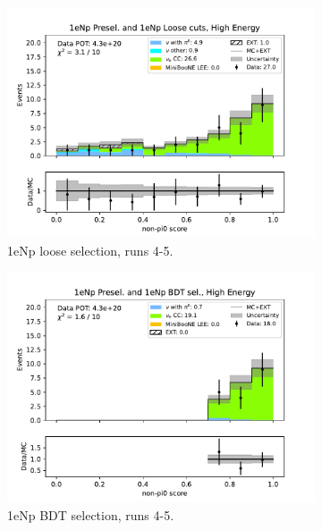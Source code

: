 \begin{figure}[H]
\begin{subfigure}{0.33\linewidth}
    \includegraphics[width=\linewidth]{technote/Sidebands/Figures/FarSideband/far_sideband_nonpi0_score_run4b4c4d5_NP_NPL_HIGH_ENERGY.pdf}
    \caption{1eNp loose selection, runs 4-5.}
    \end{subfigure}%
    \begin{subfigure}{0.33\linewidth}
    \includegraphics[width=\linewidth]{technote/Sidebands/Figures/FarSideband/far_sideband_nonpi0_score_run4b4c4d5_NP_NPBDT_HIGH_ENERGY.pdf}
    \caption{1eNp BDT selection, runs 4-5.}
    \end{subfigure}
    \begin{subfigure}{0.33\linewidth}

\end{subfigure}
\end{figure}

